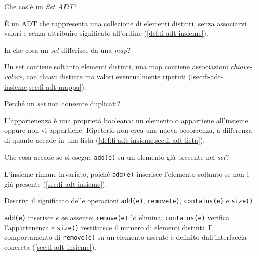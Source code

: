 \begin{exercise}
\label{ex:fi-esercizi-strutture-dati-set-definizione}
Che cos'è un \emph{Set ADT}?
\end{exercise}

È un ADT che rappresenta una collezione di elementi distinti, senza associarvi
valori e senza attribuire significato all'ordine (\cref{def:fi-adt-insieme}).

\begin{exercise}
\label{ex:fi-esercizi-strutture-dati-set-vs-map}
In che cosa un \emph{set} differisce da una \emph{map}?
\end{exercise}

Un set contiene soltanto elementi distinti; una map contiene associazioni
\emph{chiave-valore}, con chiavi distinte ma valori eventualmente ripetuti
(\cref{sec:fi-adt-insieme,sec:fi-adt-mappa}).

\begin{exercise}
\label{ex:fi-esercizi-strutture-dati-set-senza-duplicati}
Perché un \emph{set} non consente duplicati?
\end{exercise}

L'appartenenza è una proprietà booleana: un elemento o appartiene all'insieme
oppure non vi appartiene. Ripeterlo non crea una nuova occorrenza, a differenza
di quanto accade in una lista (\cref{def:fi-adt-insieme,sec:fi-adt-lista}).

\begin{exercise}
\label{ex:fi-esercizi-strutture-dati-set-add-esistente}
Che cosa accade se si esegue \texttt{add(e)} su un elemento già presente nel
\emph{set}?
\end{exercise}

L'insieme rimane invariato, poiché \texttt{add(e)} inserisce l'elemento soltanto
se non è già presente (\cref{sec:fi-adt-insieme}).

\begin{exercise}
\label{ex:fi-esercizi-strutture-dati-set-operazioni}
Descrivi il significato delle operazioni \texttt{add(e)}, \texttt{remove(e)},
\texttt{contains(e)} e \texttt{size()}.
\end{exercise}

\texttt{add(e)} inserisce \(e\) se assente; \texttt{remove(e)} lo elimina;
\texttt{contains(e)} verifica l'appartenenza e \texttt{size()} restituisce il
numero di elementi distinti. Il comportamento di \texttt{remove(e)} su un
elemento assente è definito dall'interfaccia concreta
(\cref{sec:fi-adt-insieme}).

